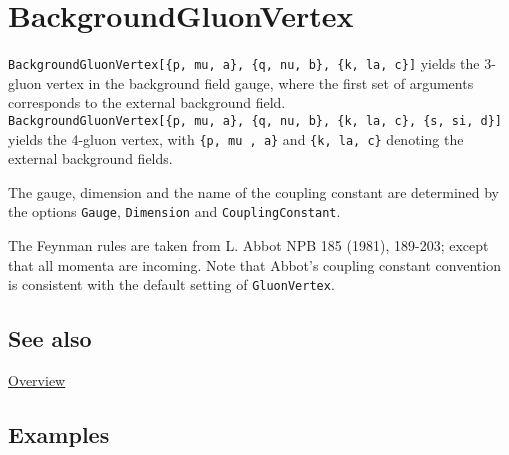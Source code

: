 \documentclass[../FeynCalcManual.tex]{subfiles}
\begin{document}
\hypertarget{backgroundgluonvertex}{%
\section{BackgroundGluonVertex}\label{backgroundgluonvertex}}

\texttt{BackgroundGluonVertex[\allowbreak{}\{\allowbreak{}p,\ \allowbreak{}mu,\ \allowbreak{}a\},\ \allowbreak{}\{\allowbreak{}q,\ \allowbreak{}nu,\ \allowbreak{}b\},\ \allowbreak{}\{\allowbreak{}k,\ \allowbreak{}la,\ \allowbreak{}c\}]}
yields the 3-gluon vertex in the background field gauge, where the first
set of arguments corresponds to the external background field.
\texttt{BackgroundGluonVertex[\allowbreak{}\{\allowbreak{}p,\ \allowbreak{}mu,\ \allowbreak{}a\},\ \allowbreak{}\{\allowbreak{}q,\ \allowbreak{}nu,\ \allowbreak{}b\},\ \allowbreak{}\{\allowbreak{}k,\ \allowbreak{}la,\ \allowbreak{}c\},\ \allowbreak{}\{\allowbreak{}s,\ \allowbreak{}si,\ \allowbreak{}d\}]}
yields the 4-gluon vertex, with
\texttt{\{\allowbreak{}p,\ \allowbreak{}mu ,\ \allowbreak{}a\}} and
\texttt{\{\allowbreak{}k,\ \allowbreak{}la,\ \allowbreak{}c\}} denoting
the external background fields.

The gauge, dimension and the name of the coupling constant are
determined by the options \texttt{Gauge}, \texttt{Dimension} and
\texttt{CouplingConstant}.

The Feynman rules are taken from L. Abbot NPB 185 (1981), 189-203;
except that all momenta are incoming. Note that Abbot's coupling
constant convention is consistent with the default setting of
\texttt{GluonVertex}.

\subsection{See also}

\hyperlink{toc}{Overview}

\subsection{Examples}

\begin{Shaded}
\begin{Highlighting}[]
\OperatorTok{[\{}\OperatorTok{,} \SpecialCharTok{\textbackslash{}}\OperatorTok{[}\OperatorTok{],} \OperatorTok{\},} \OperatorTok{\{}\OperatorTok{,} \SpecialCharTok{\textbackslash{}}\OperatorTok{[}\OperatorTok{],} \OperatorTok{\},} \OperatorTok{\{}\OperatorTok{,} \SpecialCharTok{\textbackslash{}}\OperatorTok{[}\OperatorTok{],} \OperatorTok{\}]}
\end{Highlighting}
\end{Shaded}
\end{document}
